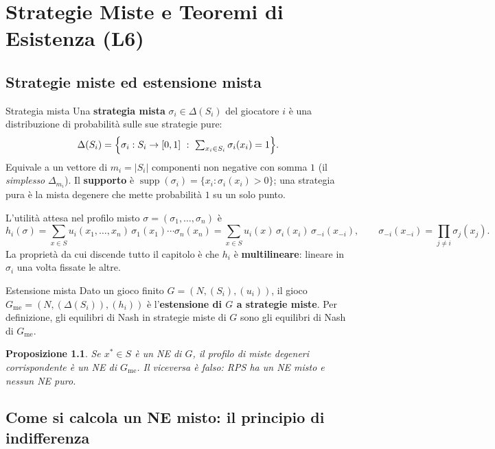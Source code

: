 \documentclass[12pt,a4paper,twoside]{book}
\theoremstyle{plain}
\newtheorem{proposition}[theorem]{Proposizione}
\theoremstyle{definition}
\DeclareMathOperator{\supp}{supp}
\begin{document}
\chapter{Strategie Miste e Teoremi di Esistenza (L6)}
\label{ch:mixed}

\section{Strategie miste ed estensione mista}

\begin{defbox}{Strategia mista}
Una \textbf{strategia mista} $\sigma_i\in\Delta(S_i)$ del giocatore $i$ è una
distribuzione di probabilità sulle sue strategie pure:
\[
  \Delta(S_i)=\Bigl\{\sigma_i:S_i\to[0,1]\ :\ \textstyle\sum_{x_i\in S_i}\sigma_i(x_i)=1\Bigr\}.
\]
Equivale a un vettore di $m_i=|S_i|$ componenti non negative con somma $1$ (il
\emph{simplesso} $\Delta_{m_i}$). Il \textbf{supporto} è
$\supp(\sigma_i)=\{x_i : \sigma_i(x_i)>0\}$; una strategia pura è la mista
degenere che mette probabilità $1$ su un solo punto.
\end{defbox}

L'utilità attesa nel profilo misto $\sigma=(\sigma_1,\dots,\sigma_n)$ è
\[
  h_i(\sigma)=\sum_{x\in S} u_i(x_1,\dots,x_n)\,\sigma_1(x_1)\cdots\sigma_n(x_n)
  =\sum_{x\in S} u_i(x)\,\sigma_i(x_i)\,\sigma_{-i}(x_{-i}),
  \qquad
  \sigma_{-i}(x_{-i})=\prod_{j\ne i}\sigma_j(x_j).
\]
La proprietà da cui discende tutto il capitolo è che $h_i$ è \textbf{multilineare}:
lineare in $\sigma_i$ una volta fissate le altre.

\begin{defbox}{Estensione mista}
Dato un gioco finito $G=(N,(S_i),(u_i))$, il gioco
$G_{\mathrm{me}}=(N,(\Delta(S_i)),(h_i))$ è l'\textbf{estensione di $G$ a strategie
miste}. Per definizione, gli equilibri di Nash in strategie miste di $G$ sono gli
equilibri di Nash di $G_{\mathrm{me}}$.
\end{defbox}

\begin{proposition}
Se $x^*\in S$ è un NE di $G$, il profilo di miste degeneri corrispondente è un NE
di $G_{\mathrm{me}}$. Il viceversa è falso: RPS ha un NE misto e nessun NE puro.
\end{proposition}

\section{Come si calcola un NE misto: il principio di indifferenza}
\end{document}

